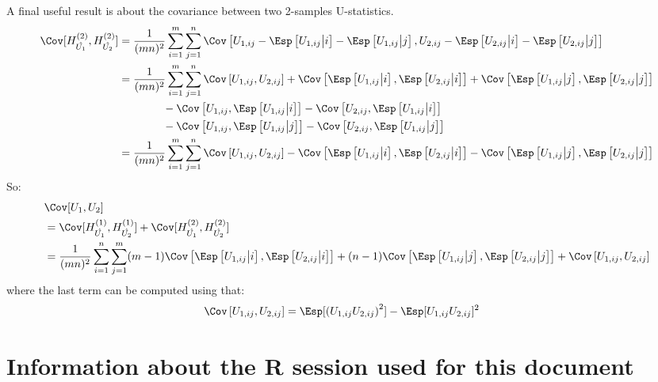\documentclass[12pt]{article}
\begin{document}
A final useful result is about the covariance between two 2-samples
U-statistics.
\begin{align*}
\Cov[H_{\hat{U_1}}^{(2)},H_{\hat{U_2}}^{(2)}] 
&= \frac{1}{(mn)^2} \sum_{i=1}^m \sum_{j=1}^n \Cov\left[U_{1,ij} - \Esp\left[ U_{1,ij} \big| i\right] - \Esp\left[ U_{1,ij} \big| j\right],
U_{2,ij} - \Esp\left[ U_{2,ij} \big| i\right] - \Esp\left[ U_{2,ij} \big| j\right] \right] \\
&= \frac{1}{(mn)^2} \sum_{i=1}^m \sum_{j=1}^n \Cov\left[U_{1,ij},U_{2,ij}\right] 
+ \Cov\left[\Esp\left[ U_{1,ij} \big| i\right],\Esp\left[ U_{2,ij} \big| i\right]\right]
+ \Cov\left[\Esp\left[ U_{1,ij} \big| j\right],\Esp\left[ U_{2,ij} \big| j\right]\right] \\
&\qquad \qquad-\Cov\left[U_{1,ij},\Esp\left[ U_{1,ij} \big| i\right]\right]-\Cov\left[U_{2,ij},\Esp\left[ U_{1,ij} \big| i\right]\right] \\
&\qquad \qquad-\Cov\left[U_{1,ij},\Esp\left[ U_{1,ij} \big| j\right]\right]-\Cov\left[U_{2,ij},\Esp\left[ U_{1,ij} \big| j\right]\right] \\
&= \frac{1}{(mn)^2} \sum_{i=1}^m \sum_{j=1}^n \Cov\left[U_{1,ij},U_{2,ij}\right] 
- \Cov\left[\Esp\left[ U_{1,ij} \big| i\right],\Esp\left[ U_{2,ij} \big| i\right]\right]
- \Cov\left[\Esp\left[ U_{1,ij} \big| j\right],\Esp\left[ U_{2,ij} \big| j\right]\right] \\
\end{align*}
So:
\begin{align*}
&\Cov[U_1,U_2] \\
&= \Cov[H_{\hat{U_1}}^{(1)},H_{\hat{U_2}}^{(1)}] + \Cov[H_{\hat{U_1}}^{(2)},H_{\hat{U_2}}^{(2)}]  \\
&= \frac{1}{(mn)^2} \sum_{i=1}^n \sum_{j=1}^m
  (m-1) \Cov\left[\Esp\left[ U_{1,ij} \big| i\right],\Esp\left[ U_{2,ij} \big| i\right]\right]
+ (n-1) \Cov\left[\Esp\left[ U_{1,ij} \big| j\right],\Esp\left[ U_{2,ij} \big| j\right]\right] 
+ \Cov\left[U_{1,ij},U_{2,ij}\right]
\end{align*}
where the last term can be computed using that:
\begin{align*}
\Cov\left[U_{1,ij},U_{2,ij}\right] 
&= \Esp[\left(U_{1,ij} U_{2,ij}\right)^2] - \Esp[U_{1,ij} U_{2,ij}]^2
\end{align*}

\clearpage 

\section{Information about the R session used for this document}
\label{sec:org4ad64b0}
\end{document}
